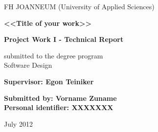 \begin{titlepage}

\begin{center}
\large

FH JOANNEUM (University of Applied Sciences)

\vspace{4.0cm}
{\large\bf <<Title of your work>>}
  
\vspace{2.0cm}  
{\bf Project Work I - Technical Report}

\vspace{0.5cm}
submitted to the degree program \\
Software Design

\vspace{2.0cm}
{\bf Supervisor: Egon Teiniker} 

\vspace{2.0cm}
 {\bf Submitted by: Vorname Zuname\\
  Personal identifier: XXXXXXX}

\vspace{2cm}
July 2012     

\end{center}

\end{titlepage}
